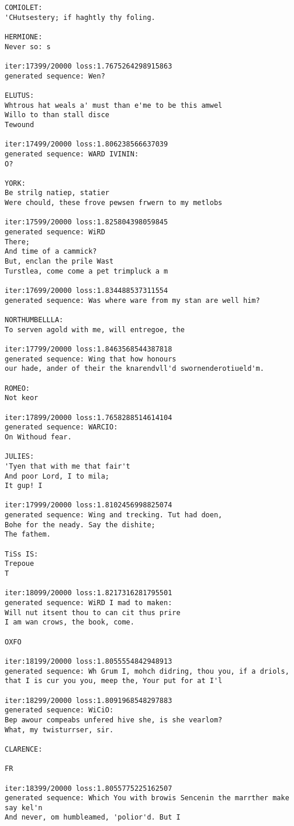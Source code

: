 \documentclass[11pt]{article}
\begin{document}
\begin{Verbatim}[commandchars=\\\{\}]
COMIOLET:
'CHutsestery; if haghtly thy foling.

HERMIONE:
Never so: s

iter:17399/20000 loss:1.7675264298915863
generated sequence: Wen?

ELUTUS:
Whtrous hat weals a' must than e'me to be this amwel
Willo to than stall disce
Tewound 

iter:17499/20000 loss:1.806238566637039
generated sequence: WARD IVININ:
O?

YORK:
Be strilg natiep, statier
Were chould, these frove pewsen frwern to my metlobs

iter:17599/20000 loss:1.825804398059845
generated sequence: WiRD
There;
And time of a cammick?
But, enclan the prile Wast
Turstlea, come come a pet trimpluck a m

iter:17699/20000 loss:1.834488537311554
generated sequence: Was where ware from my stan are well him?

NORTHUMBELLLA:
To serven agold with me, will entregoe, the

iter:17799/20000 loss:1.8463568544387818
generated sequence: Wing that how honours
our hade, ander of their the knarendvll'd swornenderotiueld'm.

ROMEO:
Not keor

iter:17899/20000 loss:1.7658288514614104
generated sequence: WARCIO:
On Withoud fear.

JULIES:
'Tyen that with me that fair't
And poor Lord, I to mila;
It gup! I 

iter:17999/20000 loss:1.8102456998825074
generated sequence: Wing and trecking. Tut had doen,
Bohe for the neady. Say the dishite;
The fathem.

TiSs IS:
Trepoue
T

iter:18099/20000 loss:1.8217316281795501
generated sequence: WiRD I mad to maken:
Will nut itsent thou to can cit thus prire
I am wan crows, the book, come.

OXFO

iter:18199/20000 loss:1.8055554842948913
generated sequence: Wh Grum I, mohch didring, thou you, if a driols, that I is cur you you, meep the, Your put for at I'l

iter:18299/20000 loss:1.8091968548297883
generated sequence: WiCiO:
Bep awour compeabs unfered hive she, is she vearlom?
What, my twisturrser, sir.

CLARENCE:

FR

iter:18399/20000 loss:1.8055775225162507
generated sequence: Which You with browis Sencenin the marrther make say kel'n
And never, om humbleamed, 'polior'd. But I


\end{Verbatim}
\end{document}
